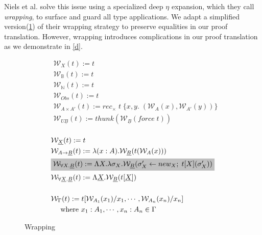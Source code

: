 \documentclass[acmsmall]{acmart}
\begin{document}
Niels et al.\cite{NonParam} solve this issue using a specialized deep $\eta$ expansion, which they call \textit{wrapping}, to surface and guard all type applications. We adapt a simplified version(\cref{fig:wrapping}) of their wrapping strategy to preserve equalities in our proof translation. However, wrapping introduces complications in our proof translation as we demonstrate in \cref{d}.

\begin{figure}[H]
  \centering
  \scriptsize
  \begin{minipage}[t]{0.48\textwidth}
    \[
    \begin{aligned}
      &\mathcal{W} _X(t) := t \\
      &\mathcal{W} _\mathbb{B}(t) := t \\
      &\mathcal{W} _\mathbb{N}(t) := t \\
      &\mathcal{W} _{Obs}(t) := t \\
      &\mathcal{W} _{A \times A'}(t) := rec_\times \;t\;\{x,y.\; (\mathcal{W} _A(x),\mathcal{W} _{A'}(y))\} \\
      &\mathcal{W}_{U\underline{B}}(t) := thunk(\mathcal{W} _{\underline{B}}(force\;t)) \\
    \end{aligned}
    \]
  \end{minipage}\hspace{2em}%
  \begin{minipage}[t]{0.48\textwidth}
    \[
    \begin{aligned}
      &\mathcal{W}_{\underline{X}}(t) := t\\
      &\mathcal{W} _{A \rightarrow \underline{B}}(t) := \lambda(x:A).\mathcal{W}_{\underline{B}}(t(\mathcal{W}_A(x))) \\
      &\colorbox{lightgray}{$\mathcal{W}_{\forall X.\underline{B}}(t) := 
      \Lambda X.\lambda \sigma_X.  \mathcal{W}_{\underline{B}}(\sigma_X'\leftarrow new_X;\;t[X](\sigma_X'))$} \\
      &\mathcal{W}_{\forall \underline{X}.\underline{B}}(t) := \Lambda \underline{X}.\mathcal{W}_{\underline{B}}(t[\underline{X}]) \\\\
      &\mathcal{W}_\Gamma(t) := t[\mathcal{W}_{A_1}(x_1)/x_1,\cdots,\mathcal{W}_{A_n}(x_n)/x_n] \\
      &\quad \text{ where } x_1:A_1,\cdots,x_n:A_n \in \Gamma
    \end{aligned}
    \]
  \end{minipage}
  \caption{Wrapping}
  \label{fig:wrapping}
\end{figure}
\end{document}

